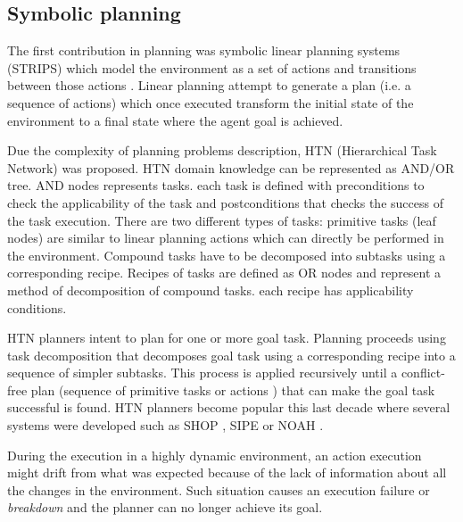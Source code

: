 \documentclass[conference]{IEEEtran}
\begin{document}
	\subsection{Symbolic planning}
	\label{sec:symbolic}
	The first contribution in planning was symbolic linear planning systems (STRIPS)\cite{fikes1972strips} which model the environment as a set of actions and transitions between those actions . Linear planning attempt to generate a plan (i.e. a sequence of actions) which once executed transform the initial state of the environment to a final state where the agent goal is achieved. 
%	
	\par Due the complexity of planning problems description, HTN (Hierarchical Task Network)  \cite{erol1996hierarchical} was proposed. 	
	  HTN domain knowledge can be represented as AND/OR tree. AND nodes represents tasks. each task is defined with preconditions to check the applicability of the task and postconditions  that checks the success of the task execution. There are two different types of tasks: primitive tasks (leaf nodes) are similar to linear planning actions which can directly be performed in the environment. Compound tasks have to be decomposed into subtasks using a corresponding recipe. Recipes of tasks are defined as OR nodes and represent a method of decomposition of compound tasks. each recipe has  applicability conditions.
	\par  HTN planners intent to plan for one or more goal task. Planning proceeds using task decomposition that decomposes goal task  using a corresponding recipe into a sequence of simpler subtasks. This process is applied recursively until a conflict-free plan (sequence of primitive tasks or actions ) that can make the goal task successful is found. 
	HTN planners become popular this last decade  where several systems were developed such as SHOP \cite{nau1999shop}, SIPE \cite{wilkins1988practical} or NOAH  \cite{sacerdoti1975structure}. 
	\par During the execution in a highly dynamic environment, an action execution might drift from what was expected because of the lack of information about all the changes in the environment. Such situation causes an execution failure or \emph{breakdown} and the planner can no longer achieve its goal. 
\end{document}
